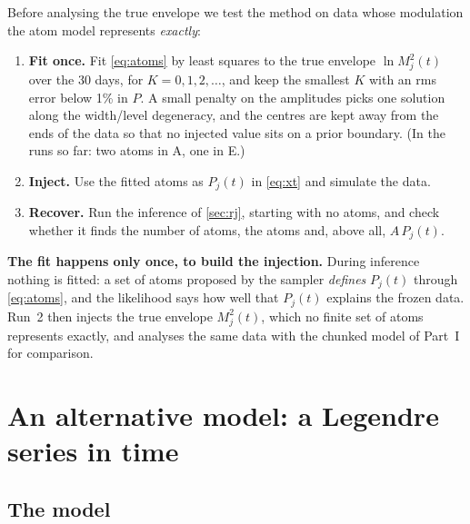 \documentclass[11pt,a4paper]{article}
\begin{document}
Before analysing the true envelope we test the method on data whose modulation the
atom model represents \emph{exactly}:
\begin{enumerate}
  \item \textbf{Fit once.} Fit \cref{eq:atoms} by least squares to the true envelope
        $\ln M_j^2(t)$ over the 30 days, for $K=0,1,2,\dots$, and keep the smallest
        $K$ with an rms error below 1\% in $P$. A small penalty on the amplitudes picks
        one solution along the width/level degeneracy, and the centres are kept away
        from the ends of the data so that no injected value sits on a prior boundary.
        (In the runs so far: two atoms in A, one in E.)
  \item \textbf{Inject.} Use the fitted atoms as $P_j(t)$ in \cref{eq:xt} and simulate
        the data.
  \item \textbf{Recover.} Run the inference of \cref{sec:rj}, starting with no atoms,
        and check whether it finds the number of atoms, the atoms and, above all,
        $A\,P_j(t)$.
\end{enumerate}
\textbf{The fit happens only once, to build the injection.} During inference nothing
is fitted: a set of atoms proposed by the sampler \emph{defines} $P_j(t)$ through
\cref{eq:atoms}, and the likelihood says how well that $P_j(t)$ explains the frozen
data. Run~2 then injects the true envelope $M_j^2(t)$, which no finite set of atoms
represents exactly, and analyses the same data with the chunked model of Part~I for
comparison.

\section{An alternative model: a Legendre series in time}\label{sec:legendre}

\subsection{The model}
\end{document}
